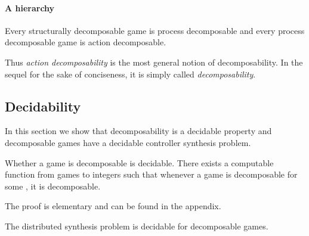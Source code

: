 \documentclass[a4paper,UKenglish]{lipics-v2016}
\begin{document}
\paragraph*{A hierarchy}


\begin{lemma}\label{lem:hier}
Every structurally decomposable game is process decomposable
and every process decomposable game is action decomposable.
\end{lemma}

Thus \emph{action decomposability} is the most general notion
of decomposability.
In the sequel for the sake of conciseness,
it is simply called \emph{decomposability}.


\subsection{Decidability}
In this section we show that decomposability is a decidable property
and decomposable games have a decidable controller synthesis problem.




\begin{lemma}
\label{decdec}
 Whether a game is decomposable is decidable.
There exists a computable function 
from games to integers
such that whenever a game 
is  decomposable
 for some , it is  decomposable.
 \end{lemma}
 The proof is elementary and can be found in the appendix.




\begin{theorem}\label{theo:dec}
The distributed synthesis problem is decidable for decomposable games.
\end{theorem}
\end{document}
